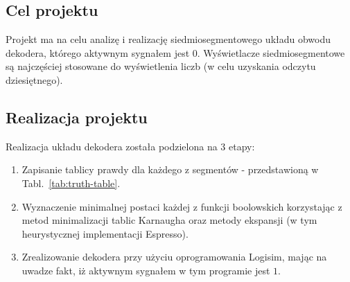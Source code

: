 \subsection{Cel projektu}\label{subsec:intro-goal}
Projekt ma na celu analizę i realizację siedmiosegmentowego układu obwodu dekodera, którego aktywnym sygnałem jest $0$.
Wyświetlacze siedmiosegmentowe są najczęściej stosowane do
wyświetlenia liczb (w celu uzyskania odczytu dziesiętnego).

\subsection{Realizacja projektu}\label{subsec:intro-how}
Realizacja układu dekodera została podzielona na 3 etapy:
\begin{enumerate}
    \item Zapisanie tablicy prawdy dla każdego z segmentów - przedstawioną w Tabl.~\ref{tab:truth-table}.
    \item Wyznaczenie minimalnej postaci każdej z funkcji boolowskich korzystając
          z metod minimalizacji tablic Karnaugha oraz metody ekspansji (w tym heurystycznej implementacji Espresso).
    \item Zrealizowanie dekodera przy użyciu oprogramowania Logisim, mając na uwadze fakt,
          iż aktywnym sygnałem w tym programie jest $1$.
\end{enumerate}

